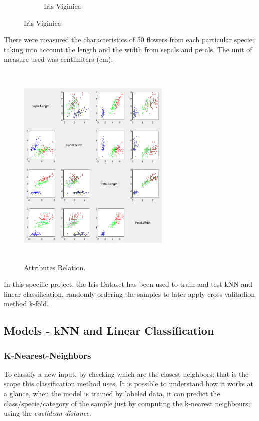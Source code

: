 \documentclass[11pt]{article}
\begin{document}
\begin{figure}[H]
\begin{subfigure}{0.32\textwidth}
  \caption{Iris Viginica}
 \end{subfigure}

\end{figure}

There were measured the characteristics of 50 flowers from each particular
specie; taking into account the length and the width from sepals and petals. The
unit of measure used was centimiters (cm).

\begin{figure}[h]
 \centering
 \includegraphics[width=0.65\textwidth, height=10cm]
                 {../images/characteristics.png}
 \caption{Attributes Relation.}
\end{figure}

In this specific project, the Iris Dataset has been used to train and test kNN
and linear classification, randomly ordering the samples to later apply
cross-valitadion method k-fold.

\subsection{Models - kNN and Linear Classification}

\subsubsection{K-Nearest-Neighbors}

To classify a new input, by checking which are the closest neighbors; that is
the scope this classification method uses. It is possible to understand how it
works at a glance, when the model is trained by labeled data, it can predict the
class/specie/category of the sample just by computing the k-nearest neighbours;
using the \textit{euclidean distance}.
\end{document}
